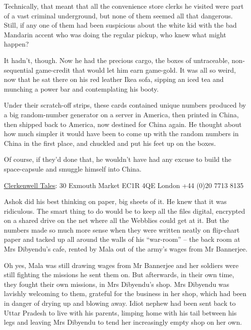 Technically, that meant that all the convenience store clerks he
visited were part of a vast criminal underground, but none of them
seemed all that dangerous. Still, if any one of them had been
suspicious about the white kid with the bad Mandarin accent who was
doing the regular pickup, who knew what might happen?

It hadn't, though. Now he had the precious cargo, the boxes of
untraceable, non-sequential game-credit that would let him earn
game-gold. It was all so weird, now that he sat there on his red
leather Ikea sofa, sipping an iced tea and munching a power bar and
contemplating his booty.

Under their scratch-off strips, these cards contained unique
numbers produced by a big random-number generator on a server in
America, then printed in China, then shipped back to America, now
destined for China again. He thought about how much simpler it
would have been to come up with the random numbers in China in the
first place, and chuckled and put his feet up on the boxes.

Of course, if they'd done that, he wouldn't have had any excuse to
build the space-capsule and smuggle himself into China.

\tb

{\href{http://www.clerkenwell-tales.co.uk/}{Clerkenwell Tales}: 30 Exmouth Market EC1R 4QE London +44 (0)20 7713 8135}

Ashok did his best thinking on paper, big sheets of it. He knew
that it was ridiculous. The smart thing to do would be to keep all
the files digital, encrypted on a shared drive on the net where all
the Webblies could get at it. But the numbers made so much more
sense when they were written neatly on flip-chart paper and tacked
up all around the walls of his ``war-room'' -- the back room at Mrs
Dibyendu's cafe, rented by Mala out of the army's wages from Mr
Bannerjee.

Oh yes, Mala was still drawing wages from Mr Bannerjee and her
soldiers were still fighting the missions he sent them on. But
afterwards, in their own time, they fought their own missions, in
Mrs Dibyendu's shop. Mrs Dibyendu was lavishly welcoming to them,
grateful for the business in her shop, which had been in danger of
drying up and blowing away. Idiot nephew had been sent back to
Uttar Pradesh to live with his parents, limping home with his tail
between his legs and leaving Mrs Dibyendu to tend her increasingly
empty shop on her own.

